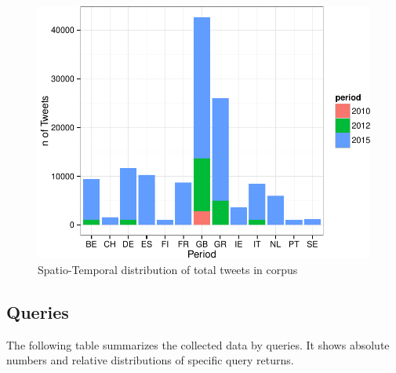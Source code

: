 \documentclass[]{article}
\begin{document}
\begin{figure}

{\centering \includegraphics{fin_paper_files/figure-latex/unnamed-chunk-5-1} 

}

\caption{Spatio-Temporal distribution of total tweets in corpus}\label{fig:unnamed-chunk-5}
\end{figure}

\subsection{Queries}\label{queries}

The following table summarizes the collected data by queries. It shows
absolute numbers and relative distributions of specific query returns.
\end{document}
